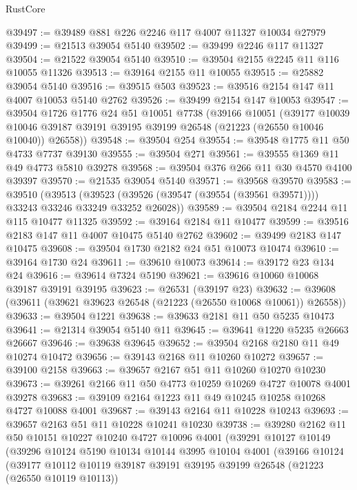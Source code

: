\begin{lexlean}{RustCore}
\begin{coremodule}
@39497 := @39489 @881 @226 @2246 @117 @4007 @11327 @10034 @27979
@39499 := @21513 @39054 @5140
@39502 := @39499 @2246 @117 @11327
@39504 := @21522 @39054 @5140
@39510 := @39504 @2155 @2245 @11 @116 @10055 @11326
@39513 := @39164 @2155 @11 @10055
@39515 := @25882 @39054 @5140
@39516 := @39515 @503
@39523 := @39516 @2154 @147 @11 @4007 @10053 @5140 @2762
@39526 := @39499 @2154 @147 @10053
@39547 := @39504
    @1726
    @1776
    @24
    @51
    @10051
    @7738
    (@39166
      @10051
      (@39177
        @10039
        @10046
        @39187
        @39191
        @39195
        @39199
        @26548
        (@21223 (@26550 @10046 @10040))
        @26558))
@39548 := @39504 @254
@39554 := @39548 @1775 @11 @50 @4733 @7737 @39130
@39555 := @39504 @271
@39561 := @39555 @1369 @11 @49 @4773 @5810 @39278
@39568 := @39504 @376 @266 @11 @30 @4570 @4100 @39397
@39570 := @21535 @39054 @5140
@39571 := @39568 @39570
@39583 := @39510
    (@39513 (@39523 (@39526 (@39547 (@39554 (@39561 @39571)))) @33243 @33246 @33249 @33252 @26028))
@39589 := @39504 @2184 @2244 @11 @115 @10477 @11325
@39592 := @39164 @2184 @11 @10477
@39599 := @39516 @2183 @147 @11 @4007 @10475 @5140 @2762
@39602 := @39499 @2183 @147 @10475
@39608 := @39504 @1730 @2182 @24 @51 @10073 @10474
@39610 := @39164 @1730 @24
@39611 := @39610 @10073
@39614 := @39172 @23 @134 @24
@39616 := @39614 @7324 @5190
@39621 := @39616 @10060 @10068 @39187 @39191 @39195
@39623 := @26531 (@39197 @23)
@39632 := @39608 (@39611 (@39621 @39623 @26548 (@21223 (@26550 @10068 @10061)) @26558))
@39633 := @39504 @1221
@39638 := @39633 @2181 @11 @50 @5235 @10473
@39641 := @21314 @39054 @5140 @11
@39645 := @39641 @1220 @5235 @26663 @26667
@39646 := @39638 @39645
@39652 := @39504 @2168 @2180 @11 @49 @10274 @10472
@39656 := @39143 @2168 @11 @10260 @10272
@39657 := @39100 @2158
@39663 := @39657 @2167 @51 @11 @10260 @10270 @10230
@39673 := @39261 @2166 @11 @50 @4773 @10259 @10269 @4727 @10078 @4001 @39278
@39683 := @39109 @2164 @1223 @11 @49 @10245 @10258 @10268 @4727 @10088 @4001
@39687 := @39143 @2164 @11 @10228 @10243
@39693 := @39657 @2163 @51 @11 @10228 @10241 @10230
@39738 := @39280
    @2162
    @11
    @50
    @10151
    @10227
    @10240
    @4727
    @10096
    @4001
    (@39291
      @10127
      @10149
      (@39296
        @10124
        @5190
        @10134
        @10144
        @3995
        @10104
        @4001
        (@39166
          @10124
          (@39177
            @10112
            @10119
            @39187
            @39191
            @39195
            @39199
            @26548
            (@21223 (@26550 @10119 @10113))

\end{coremodule}
\end{lexlean}
